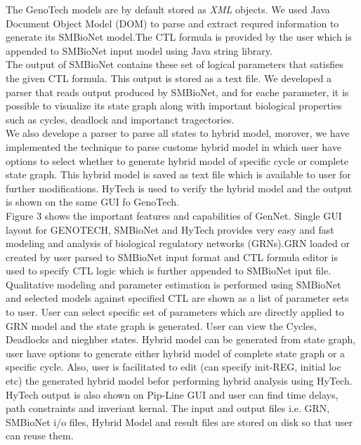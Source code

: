 \documentclass[twocolumn]{bmcart}%
\begin{document}
The GenoTech models are by default stored as \emph{XML} objects. We used Java Document Object Model (DOM) to parse and extract requred information to generate its SMBioNet model.The CTL formula is provided by the user which is appended to SMBioNet input model using Java string library.
\\
The output of SMBioNet contains these set of logical parameters that satisfies the given CTL formula. This output is stored as a text file. We developed a parser that reads output produced by SMBioNet, and for eache parameter, it is possible to visualize its state graph along with important biological properties such as cycles, deadlock and importanct tragectories.
\\
We also develope a parser to parse all states to hybrid model, morover, we have implemented the technique to parse custome hybrid model in which user have options to select whether to generate hybrid model of specific cycle or complete state graph. This hybrid model is saved as text file which is available to user for further modifications. HyTech is used to verify the hybrid model and the output is shown on the same GUI fo GenoTech.
\\
Figure 3 shows the important features and capabilities of GenNet. Single GUI layout for GENOTECH, SMBioNet and HyTech provides very easy and fast modeling and analysis of biological regulatory networks (GRNs).GRN loaded or created by user parsed to SMBioNet input format and CTL formula editor is used to specify CTL logic which is further appended to SMBioNet iput file. Qualitative modeling and parameter estimation is performed using SMBioNet and selected models against specified CTL are shown as a list of parameter sets to user. User can select specific set of parameters which are directly applied to GRN model and the state graph is generated. User can view the Cycles, Deadlocks and nieghber states. Hybrid model can be generated from state graph, user have options to generate either hybrid model of complete state graph or a specific cycle. Also, user is facilitated to edit (can specify init-REG, initial loc etc) the generated hybrid model befor performing hybrid analysis using HyTech. HyTech output is also shown on Pip-Line GUI and user can find time delays, path constraints and inveriant kernal. The input and output files i.e. GRN, SMBioNet i/o files, Hybrid Model and result files are stored on disk so that user can reuse them.
      
\end{document}

